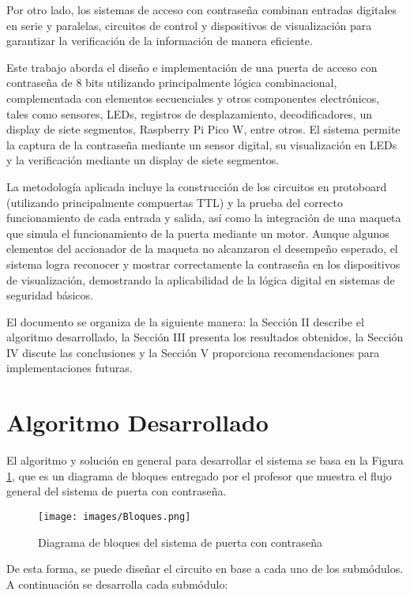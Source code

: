 \documentclass[conference]{IEEEtran}  %
\begin{document}
Por otro lado, los sistemas de acceso con contraseña combinan entradas digitales en serie y paralelas, circuitos de control y dispositivos de visualización para garantizar la verificación de la información de manera eficiente.

Este trabajo aborda el diseño e implementación de una puerta de acceso con contraseña de 8 bits utilizando principalmente lógica combinacional, complementada con elementos secuenciales y otros componentes electrónicos, tales como sensores, LEDs, registros de desplazamiento, decodificadores, un display de siete segmentos, Raspberry Pi Pico W, entre otros. El sistema permite la captura de la contraseña mediante un sensor digital, su visualización en LEDs y la verificación mediante un display de siete segmentos.

La metodología aplicada incluye la construcción de los circuitos en protoboard (utilizando principalmente compuertas TTL) y la prueba del correcto funcionamiento de cada entrada y salida, así como la integración de una maqueta que simula el funcionamiento de la puerta mediante un motor. Aunque algunos elementos del accionador de la maqueta no alcanzaron el desempeño esperado, el sistema logra reconocer y mostrar correctamente la contraseña en los dispositivos de visualización, demostrando la aplicabilidad de la lógica digital en sistemas de seguridad básicos.

El documento se organiza de la siguiente manera: la Sección II describe el algoritmo desarrollado, la Sección III presenta los resultados obtenidos, la Sección IV discute las conclusiones y la Sección V proporciona recomendaciones para implementaciones futuras.

\section{Algoritmo Desarrollado}
El algoritmo y solución en general para desarrollar el sistema se basa en la Figura \ref{fig:bloques}, que es un diagrama de bloques entregado por el profesor que muestra el flujo general del sistema de puerta con contraseña.

\begin{figure}[h]
    \centering
    \texttt{[image: images/Bloques.png]}
    \caption{Diagrama de bloques del sistema de puerta con contraseña}
    \label{fig:bloques}
\end{figure}

De esta forma, se puede diseñar el circuito en base a cada uno de los submódulos. A continuación se desarrolla cada submódulo:
\end{document}
